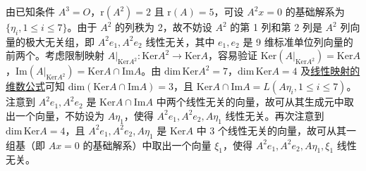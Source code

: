 \documentclass[../../main.tex]{subfiles}%
\begin{document}
\begin{solution}
由已知条件 $A^3 = O$，$\mathrm{r}(A^2) = 2$ 且 $\mathrm{r}(A) = 5$，可设 $A^2x = 0$ 的基础解系为 $\{\eta_i,1 \leqslant  i \leqslant  7\}$。由于 $A^2$ 的列秩为 2，故不妨设 $A^2$ 的第 1 列和第 2 列是 $A^2$ 列向量的极大无关组，即 $A^2e_1,A^2e_2$ 线性无关，其中 $e_1,e_2$ 是 9 维标准单位列向量的前两个。考虑限制映射 $A|_{\mathrm{Ker} A^2}:\mathrm{Ker} A^2 \to \mathrm{Ker} A$，容易验证 $\mathrm{Ker}(A|_{\mathrm{Ker} A^2}) = \mathrm{Ker} A$，$\mathrm{Im}(A|_{\mathrm{Ker} A^2}) = \mathrm{Ker} A \cap \mathrm{Im} A$。由 $\mathrm{dim}\,\mathrm{Ker} A^2 = 7$，$\mathrm{dim}\,\mathrm{Ker} A = 4$ 及\hyperref[theorem:线性映射的维数公式]{线性映射的维数公式}可知 $\mathrm{dim}(\mathrm{Ker} A \cap \mathrm{Im} A) = 3$，且 $\mathrm{Ker} A \cap \mathrm{Im} A = L(A\eta_i,1 \leqslant  i \leqslant  7)$。注意到 $A^2e_1,A^2e_2$ 是 $\mathrm{Ker} A \cap \mathrm{Im} A$ 中两个线性无关的向量，故可从其生成元中取出一个向量，不妨设为 $A\eta_1$，使得 $A^2e_1,A^2e_2,A\eta_1$ 线性无关。再次注意到 $\mathrm{dim}\,\mathrm{Ker} A = 4$，且 $A^2e_1,A^2e_2,A\eta_1$ 是 $\mathrm{Ker} A$ 中 3 个线性无关的向量，故可从其一组基（即 $Ax = 0$ 的基础解系）中取出一个向量 $\xi_1$，使得 $A^2e_1,A^2e_2,A\eta_1,\xi_1$ 线性无关。


\end{solution}
\end{document}
